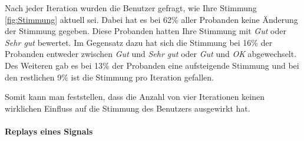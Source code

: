 Nach jeder Iteration wurden die Benutzer gefragt, wie Ihre Stimmung \autoref{fig:Stimmung} aktuell sei. 
Dabei hat es bei 62\% aller Probanden keine {\"A}nderung der Stimmung gegeben. 
Diese Probanden hatten Ihre Stimmung mit \textit{Gut} oder \textit{Sehr gut} bewertet. 
Im Gegensatz dazu hat sich die Stimmung bei 16\% der Probanden entweder zwischen \textit{Gut} und \textit{Sehr gut} oder \textit{Gut} und \textit{OK} abgewechselt. 
Des Weiteren gab es bei 13\% der Probanden eine aufsteigende Stimmung und bei den restlichen 9\% ist die Stimmung pro Iteration gefallen.

Somit kann man feststellen, dass die Anzahl von vier Iterationen keinen wirklichen Einfluss auf die Stimmung des Benutzers ausgewirkt hat.


\paragraph{Replays eines Signals}

